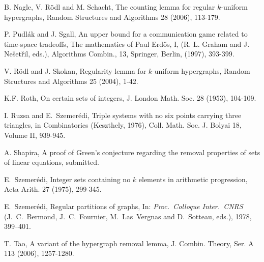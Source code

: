\documentclass [letterpaper,11pt]{article}
\begin{document}
\begin{thebibliography}{99}
B. Nagle, V. R\"odl and M. Schacht, The counting lemma for regular
$k$-uniform hypergraphs, Random Structures and Algorithms 28 (2006),
113-179.

P. Pudl\'{a}k and J. Sgall, An upper bound for a communication game
related to time-space tradeoffs, The mathematics of Paul Erd\H{o}s,
I, (R. L. Graham and J. Ne\v{s}et\v{r}il, eds.), Algorithms Combin.,
13, Springer, Berlin, (1997), 393-399.

V. R\"odl and J. Skokan, Regularity lemma for $k$-uniform
hypergraphs, Random Structures and Algorithms 25 (2004), 1-42.

K.F. Roth, On certain sets of integers, J. London Math. Soc. 28
(1953), 104-109.

I. Ruzsa and E.~Szemer\'edi, Triple systems with no six points
carrying three triangles, in Combinatorics (Keszthely, 1976), Coll.
Math. Soc. J. Bolyai 18, Volume II, 939-945.

A. Shapira, A proof of Green's conjecture regarding the removal
properties of sets of linear equations, submitted.

E.~Szemer\'edi, Integer sets containing no $k$ elements in
arithmetic progression, Acta Arith. 27 (1975), 299-345.

 E.~Szemer\'edi,
Regular partitions of graphs, In: {\em Proc.\ Colloque Inter.\
CNRS} (J.~C.~Bermond, J.~C.~Fournier, M.~Las~Vergnas and
D.~Sotteau, eds.), 1978, 399--401.

T. Tao, A variant of the hypergraph removal lemma, J.
Combin. Theory, Ser. A 113 (2006), 1257-1280.

\end{thebibliography}
\end{document}
